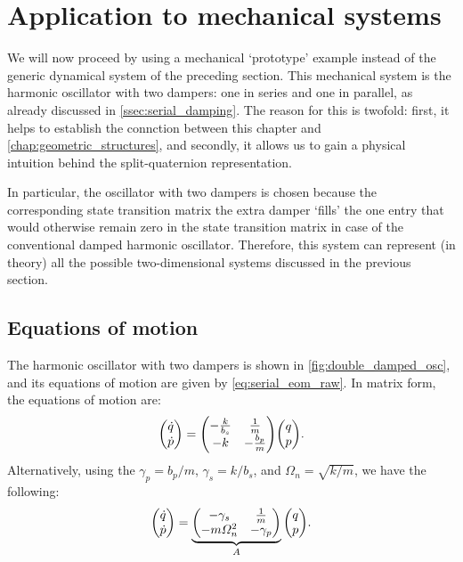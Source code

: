 \section{Application to mechanical systems}
\label{sec:mechanical}
We will now proceed by using a mechanical `prototype' example instead of the generic dynamical system of the preceding section. This mechanical system is the harmonic oscillator with two dampers: one in series and one in parallel, as already discussed in \cref{ssec:serial_damping}. The reason for this is twofold: first, it helps to establish the connction between this chapter and \cref{chap:geometric_structures}, and secondly, it allows us to gain a physical intuition behind the split-quaternion representation. 

In particular, the oscillator with two dampers is chosen because the corresponding state transition matrix the extra damper `fills' the one entry that would otherwise remain zero in the state transition matrix in case of the conventional damped harmonic oscillator. Therefore, this system can represent (in theory) all the possible two-dimensional systems discussed in the previous section.

\subsection{Equations of motion}
The harmonic oscillator with two dampers is shown in \cref{fig:double_damped_osc}, and its equations of motion are given by \cref{eq:serial_eom_raw}. In matrix form, the equations of motion are:
\begin{equation*}
    \mqty(\dot{q}\\\dot{p}) = \mqty(-\tfrac{k}{b_s} & \tfrac{1}{m} \\ -k & - \tfrac{b_p}{m})\mqty(q \\ p).
\end{equation*}
Alternatively, using the $\gamma_p = b_p/m$, $\gamma_s = k/b_s$, and $\Omega_n = \sqrt{k/m}$, we have the following:
\begin{equation}
    \mqty(\dot{q}\\\dot{p}) = \underbrace{\mqty(-\gamma_s & \frac{1}{m} \\ -m\Omega_n^2 & - \gamma_p)}_A \mqty(q \\ p).
    \label{eq:ddho_eom}
\end{equation}

